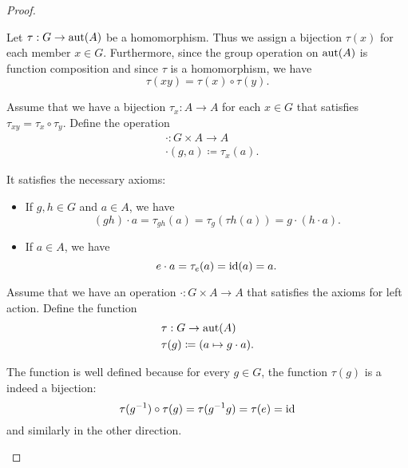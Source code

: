 \begin{proof}\mbox{}
  \begin{description}
     Let \( \tau: G \to \operatorname{aut}(A) \) be a homomorphism. Thus we assign a bijection \( \tau(x) \) for each member \( x \in G \). Furthermore, since the group operation on \( \operatorname{aut}(A) \) is function composition and since \( \tau \) is a homomorphism, we have
    \begin{equation*}
      \tau(xy) = \tau(x) \circ \tau(y).
    \end{equation*}

     Assume that we have a bijection \( \tau_x: A \to A \) for each \( x \in G \) that satisfies \( \tau_{xy} = \tau_x \circ \tau_y \). Define the operation
    \begin{align*}
      &\cdot: G \times A \to A \\
      &\cdot(g, a) \coloneqq \tau_x(a).
    \end{align*}

    It satisfies the necessary axioms:
    \begin{itemize}
      \item If \( g, h \in G \) and \( a \in A \), we have
      \begin{equation*}
        (g h) \cdot a
        =
        \tau_{g h}(a)
        =
        \tau_{g}(\tau{h}(a))
        =
        g \cdot (h \cdot a).
      \end{equation*}

      \item If \( a \in A \), we have
      \begin{equation*}
        e \cdot a
        =
        \tau_e(a)
        =
        \operatorname{id}(a)
        =
        a.
      \end{equation*}
    \end{itemize}

     Assume that we have an operation \( \cdot: G \times A \to A \) that satisfies the axioms for left action. Define the function
    \begin{align*}
      &\tau: G \to \operatorname{aut}(A) \\
      &\tau(g) \coloneqq (a \mapsto g \cdot a).
    \end{align*}

    The function is well defined because for every \( g \in G \), the function \( \tau(g) \) is a indeed a bijection:
    \begin{equation*}
      \tau(g^{-1}) \circ \tau(g)
      =
      \tau(g^{-1} g)
      =
      \tau(e)
      =
      \operatorname{id}
    \end{equation*}
    and similarly in the other direction.


\end{description}
\end{proof}
